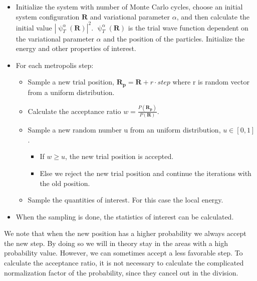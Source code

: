 \begin{itemize}
    \item Initialize the system with number of Monte Carlo cycles, choose an initial system configuration $\boldsymbol{R}$ and variational parameter $\alpha$, and then calculate the initial value $|\uppsi_T^\alpha(\boldsymbol{R})|^2$. $\uppsi_T^\alpha(\boldsymbol{R})$ is the trial wave function dependent on the variational parameter $\alpha$ and the position of the particles. Initialize the energy and other properties of interest. 
    \item For each metropolis step:
    \begin{itemize}
        \item Sample a new trial position, $\boldsymbol{R_p} = \boldsymbol{R} + r\cdot step$ where r is random vector from a uniform distribution. 
        \item Calculate the acceptance ratio $w = \frac{P(\boldsymbol{R_p})}{P(\boldsymbol{R})}$.
        \item Sample a new random number u from an uniform distribution, $u \in [0,1]$. 
        \begin{itemize}
            \item If $w \geq u$, the new trial position is accepted.
            \item Else we reject the new trial position and continue the iterations with the old position. 
        \end{itemize}
        \item Sample the quantities of interest. For this case the local energy.
    \end{itemize}
    \item When the sampling is done, the statistics of interest can be calculated. 
\end{itemize}
We note that when the new position has a higher probability we always accept the new step. By doing so we will in theory stay in the areas with a high probability value. However, we can sometimes accept a less favorable step.  
To calculate the acceptance ratio, it is not necessary to calculate the complicated normalization factor of the probability, since they cancel out in the division. 


